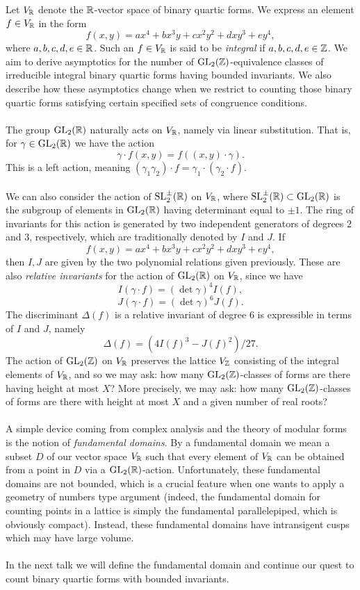 \documentclass[12pt,amsfont]{amsart}
\begin{document}
Let $V_{\mathbb R}$ denote the ${\mathbb R}$-vector space of binary quartic forms. We express an element $f \in V_{\mathbb R}$ in the form
\[f(x,y) = ax^4 + bx^3 y + cx^2 y^2 + dxy^3 + ey^4, \]
where $a,b,c,d,e \in {\mathbb R}$. Such an $f \in V_{\mathbb R}$ is said to be \emph{integral} if $a,b,c,d,e \in {\mathbb Z}$. We aim to derive asymptotics for the number of $\operatorname{GL}_2({\mathbb Z})$-equivalence classes of irreducible integral binary quartic forms having bounded invariants. We also describe how these asymptotics change when we restrict to counting those binary quartic forms satisfying certain specified sets of congruence conditions. \\ \\
The group $\operatorname{GL}_2({\mathbb R})$ naturally acts on $V_{\mathbb R}$, namely via linear substitution. That is, for $\gamma \in \operatorname{GL}_2({\mathbb R})$ we have the action
\[\gamma \cdot f(x,y) = f((x,y) \cdot \gamma).\] 
This is a left action, meaning $(\gamma_1 \gamma_2) \cdot f = \gamma_1 \cdot (\gamma_2 \cdot f).$ \\ \\
We can also consider the action of $\operatorname{SL}_2^{\pm} ({\mathbb R})$ on $V_{\mathbb R}$, where $\operatorname{SL}_2^{\pm}({\mathbb R}) \subset \operatorname{GL}_2({\mathbb R})$ is the subgroup of elements in $\operatorname{GL}_2({\mathbb R})$ having determinant equal to $\pm 1$. The ring of invariants for this action is generated by two independent generators of degrees $2$ and $3$, respectively, which are traditionally denoted by $I$ and $J$. If 
\[f(x,y) = ax^4 + bx^3 y + cx^2 y^2 + dxy^3 + ey^4,\]
then $I, J$ are given by the two polynomial relations given previously. These are also \emph{relative invariants} for the action of $\operatorname{GL}_2({\mathbb R})$ on $V_{\mathbb R}$, since we have
\[I(\gamma \cdot f) = (\det \gamma)^4 I(f), \]
\[J(\gamma \cdot f) = (\det \gamma)^6 J(f).\]
The discriminant $\Delta(f)$ is a relative invariant of degree $6$ is expressible in terms of $I$ and $J$, namely
\[\Delta(f) = (4I(f)^3 - J(f)^2)/27.\]
The action of $\operatorname{GL}_2({\mathbb Z})$ on $V_{\mathbb R}$ preserves the lattice $V_{\mathbb Z}$ consisting of the integral elements of $V_{\mathbb R}$, and so we may ask: how many $\operatorname{GL}_2({\mathbb Z})$-classes of forms are there having height at most $X$? More precisely, we may ask: how many $\operatorname{GL}_2({\mathbb Z})$-classes of forms are there with height at most $X$ and a given number of real roots? \\ \\
A simple device coming from complex analysis and the theory of modular forms is the notion of \emph{fundamental domains}. By a fundamental domain we mean a subset $D$ of our vector space $V_{\mathbb R}$ such that every element of $V_{\mathbb R}$ can be obtained from a point in $D$ via a $\operatorname{GL}_2({\mathbb R})$-action. Unfortunately, these fundamental domains are not bounded, which is a crucial feature when one wants to apply a geometry of numbers type argument (indeed, the fundamental domain for counting points in a lattice is simply the fundamental parallelepiped, which is obviously compact). Instead, these fundamental domains have intransigent cusps which may have large volume. \\ \\
In the next talk we will define the fundamental domain and continue our quest to count binary quartic forms with bounded invariants. 
\end{document}
